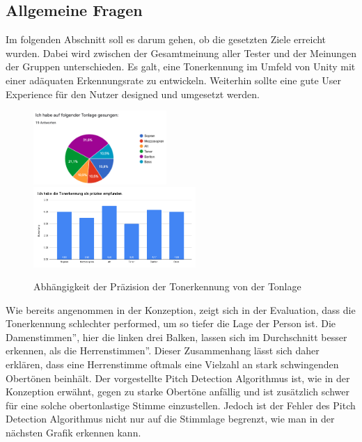 \subsection*{Allgemeine Fragen}
Im folgenden Abschnitt soll es darum gehen, ob die gesetzten Ziele erreicht wurden. Dabei wird zwischen der Gesamtmeinung aller Tester und der Meinungen der Gruppen unterschieden. Es galt, eine Tonerkennung im Umfeld von Unity mit einer adäquaten Erkennungsrate zu entwickeln. Weiterhin sollte eine gute User Experience für den Nutzer designed und umgesetzt werden. 
\begin{figure}[H]
    \includegraphics[width=0.45\textwidth]{Bilder/eval-tonart.png}
    \includegraphics[width=0.55\textwidth]{Bilder/eval-tonerkennung-vergleichLagen.png}
    \caption{Abhängigkeit der Präzision der Tonerkennung von der Tonlage}
\end{figure}
Wie bereits angenommen in der Konzeption, zeigt sich in der Evaluation, dass die Tonerkennung schlechter performed, um so tiefer die Lage der Person ist. Die \glqq Damenstimmen'', hier die linken drei Balken, lassen sich im Durchschnitt besser erkennen, als die \glqq Herrenstimmen''. Dieser Zusammenhang lässt sich daher erklären, dass eine Herrenstimme oftmals eine Vielzahl an stark schwingenden Obertönen beinhält. Der vorgestellte Pitch Detection Algorithmus ist, wie in der Konzeption erwähnt, gegen zu starke Obertöne anfällig und ist zusätzlich schwer für eine solche obertonlastige Stimme einzustellen. Jedoch ist der Fehler des Pitch Detection Algorithmus nicht nur auf die Stimmlage begrenzt, wie man in der nächsten Grafik erkennen kann. 

